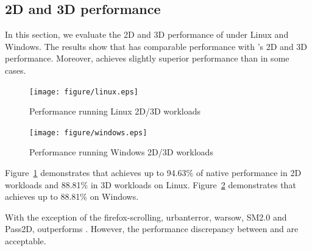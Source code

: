 \subsection{2D and 3D performance}
In this section, we evaluate the 2D and 3D performance of \name{} under Linux and Windows. The results show
that \name{} has comparable performance with \gvirt{}'s 2D and 3D performance.
Moreover, \name{} achieves slightly superior performance than \gvirt{} in some cases.

\begin{figure}[htbp]
  \centering
  \texttt{[image: figure/linux.eps]}\\
  \caption{Performance running Linux 2D/3D workloads}
  \label{fig:linux}
\end{figure}

\begin{figure}[htbp]
  \centering
  \texttt{[image: figure/windows.eps]}\\
  \caption{Performance running Windows 2D/3D workloads}
  \label{fig:windows}
\end{figure}
\hspace{0pt}

Figure~{\ref{fig:linux}} demonstrates that \name{} achieves up to 94.63\% of native performance in 2D workloads and 88.81\% in 3D workloads on Linux.
Figure~{\ref{fig:windows}} demonstrates that \name{} achieves up to 88.81\% on Windows.

With the exception of the firefox-scrolling, urbanterror, warsow, SM2.0 and Pass2D, \name{} outperforms \gvirt{}. However,
the performance discrepancy between \name{} and \gvirt{} are acceptable.
